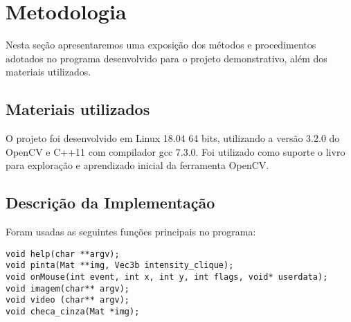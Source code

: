 \documentclass{bmvc2k}
\begin{document}
\section{Metodologia}
\label{sec:Methods}
Nesta seção apresentaremos uma exposição dos métodos e procedimentos adotados no programa desenvolvido para o projeto demonstrativo, além dos materiais utilizados.
\subsection{Materiais utilizados}
O projeto foi desenvolvido em Linux 18.04 64 bits, utilizando a versão 3.2.0 do OpenCV e C++11 com compilador gcc 7.3.0. Foi utilizado como suporte o livro~\cite{kaehler2016learning} para exploração e aprendizado inicial da ferramenta OpenCV.

\subsection{Descrição da Implementação}
Foram usadas as seguintes funções principais no programa:
\begin{lstlisting}
void help(char **argv);
void pinta(Mat **img, Vec3b intensity_clique);
void onMouse(int event, int x, int y, int flags, void* userdata);
void imagem(char** argv);
void video (char** argv);
void checa_cinza(Mat *img);
\end{lstlisting}
\end{document}
